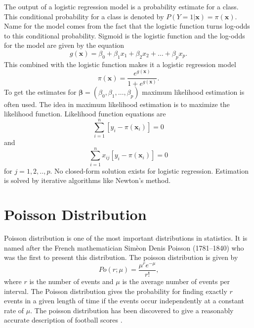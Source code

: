 The output of a logistic regression model is a probability estimate for a class. This conditional probability for a class is denoted by $P ( Y = 1 | \mathbf { x } ) = \pi ( \mathbf { x } )$. Name for the model comes from the fact that the logistic function turns log-odds to this conditional probability. Sigmoid is the logistic function and the log-odds for the model are given by the equation
\begin{equation}
    g ( \mathbf { x } ) = \beta _ { 0 } + \beta _ { 1 } x _ { 1 } + \beta _ { 2 } x _ { 2 } + \ldots + \beta _ { p } x _ { p }.
\end{equation}
This combined with the logistic function makes it a logistic regression model
\begin{equation}
    \pi ( \mathbf { x } ) = \frac { e ^ { g ( \mathbf { x } ) } } { 1 + e ^ { g ( \mathbf { x } ) } }.
\end{equation}
To get the estimates for $\boldsymbol { \beta } = \left( \beta _ { 0 } , \beta _ { 1 } , \ldots , \beta _ { p } \right)$ maximum likelihood estimation is often used. The idea in maximum likelihood estimation is to maximize the likelihood function. Likelihood function equations are
\begin{equation}
    \sum _ { i = 1 } ^ { n } \left[ y _ { i } - \pi \left( \mathbf { x } _ { i } \right) \right] = 0
\end{equation}
and
\begin{equation}
    \sum _ { i = 1 } ^ { n } x _ { i j } \left[ y _ { i } - \pi \left( \mathbf { x } _ { i } \right) \right] = 0
\end{equation}
for $j=1,2,..,p$. \cite{hosmer2013applied} No closed-form solution exists for logistic regression. Estimation is solved by iterative algorithms like Newton's method.

\section{Poisson Distribution}
Poisson distribution is one of the most important distributions in statistics. It is named after the French mathematician Simèon Denis Poisson (1781–1840) who was the first to present this distribution. The poisson distribution is given by
\begin{equation}
    Po ( r ; \mu ) = \frac { \mu ^ { r } e ^ { - \mu } } { r ! } \text{,}
\end{equation}
where $r$ is the number of events and $\mu$ is the average number of events per interval. The Poisson distribution gives the probability for finding exactly $r$ events in a given length of time if the events occur independently at a constant rate of $\mu$. \cite{walck1996hand} The poisson distribution has been discovered to give a reasonably accurate description of football scores \cite{maher1982modelling}.


